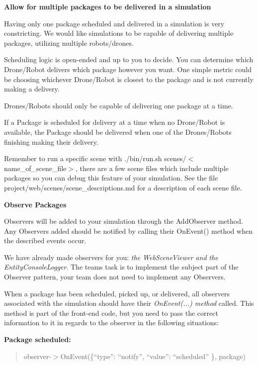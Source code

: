 \begin{DoxyEnumerate}
\item {\bfseries Allow for multiple packages to be delivered in a simulation}
\begin{DoxyItemize}
\item Having only one package scheduled and delivered in a simulation is very constricting. We would like simulations to be capable of delivering multiple packages, utilizing multiple robots/drones.
\item Scheduling logic is open-\/ended and up to you to decide. You can determine which Drone/\+Robot delivers which package however you want. One simple metric could be choosing whichever Drone/\+Robot is closest to the package and is not currently making a delivery.
\item Drones/\+Robots should only be capable of delivering one package at a time.
\item If a Package is scheduled for delivery at a time when no Drone/\+Robot is available, the Package should be delivered when one of the Drones/\+Robots finishing making their delivery.
\item Remember to run a specific scene with {\ttfamily ./bin/run.sh scenes/$<$name\+\_\+of\+\_\+scene\+\_\+file$>$}, there are a few scene files which include multiple packages so you can debug this feature of your simulation. See the file {\ttfamily project/web/scenes/scene\+\_\+descriptions.\+md} for a description of each scene file.
\end{DoxyItemize}
\item {\bfseries Observe Packages}
\begin{DoxyItemize}
\item Observers will be added to your simulation through the {\ttfamily Add\+Observer} method. Any Observers added should be notified by calling their {\ttfamily On\+Event()} method when the described events occur.
\item We have already made observers for you\+: {\itshape the Web\+Scene\+Viewer and the Entity\+Console\+Logger}. The teams task is to implement the subject part of the Observer pattern, your team does not need to implement any Observers.
\item When a package has been scheduled, picked up, or delivered, all observers associated with the simulation should have their {\itshape On\+Event(...) method} called. This method is part of the front-\/end code, but you need to pass the correct information to it in regards to the observer in the following situations\+:
\begin{DoxyItemize}
\item {\bfseries Package scheduled\+:} \begin{quote}
observer-\/$>$On\+Event(\{“type”\+: “notify”, “value”\+: “scheduled” \}, package) \end{quote}


\end{DoxyItemize}
\end{DoxyItemize}
\end{DoxyEnumerate}
